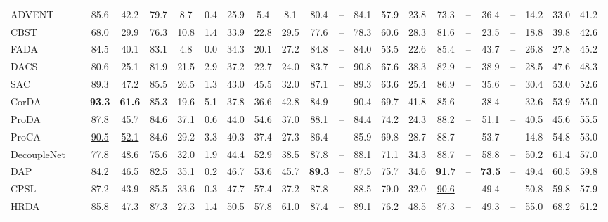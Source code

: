 \documentclass[10pt,twocolumn,letterpaper]{article}
\begin{document}
\begin{table*}
\begin{tabular}{l|c|ccccccccccccccccccc|c}
ADVENT~\cite{vu2019advent} & \parbox[t]{2mm}{} & 85.6 & 42.2 & 79.7 & 8.7 & 0.4 & 25.9 & 5.4 & 8.1 & 80.4 & -- & 84.1 & 57.9 & 23.8 & 73.3 & -- & 36.4 & -- & 14.2 & 33.0 & 41.2\\
CBST~\cite{zou2018unsupervised} &  & 68.0 & 29.9 & 76.3 & 10.8 & 1.4 & 33.9 & 22.8 & 29.5 & 77.6 & -- & 78.3 & 60.6 & 28.3 & 81.6 & -- & 23.5 & -- & 18.8 & 39.8 & 42.6\\
FADA~\cite{wang2020classes} &  & 84.5 & 40.1 & 83.1 & 4.8 & 0.0 & 34.3 & 20.1 & 27.2 & 84.8 & -- & 84.0 & 53.5 & 22.6 & 85.4 & -- & 43.7 & -- & 26.8 & 27.8 & 45.2\\
DACS~\cite{tranheden2021dacs} &  & 80.6 & 25.1 & 81.9 & 21.5 & 2.9 & 37.2 & 22.7 & 24.0 & 83.7 & -- & 90.8 & 67.6 & 38.3 & 82.9 & -- & 38.9 & -- & 28.5 & 47.6 & 48.3\\
SAC~\cite{araslanov2021self} &  & 89.3 & 47.2 & 85.5 & 26.5 & 1.3 & 43.0 & 45.5 & 32.0 & 87.1 & -- & 89.3 & 63.6 & 25.4 & 86.9 & -- & 35.6 & -- & 30.4 & 53.0 & 52.6\\
CorDA~\cite{wang2021domain} &  & \textbf{93.3} & \textbf{61.6} & 85.3 & 19.6 & 5.1 & 37.8 & 36.6 & 42.8 & 84.9 & -- & 90.4 & 69.7 & 41.8 & 85.6 & -- & 38.4 & -- & 32.6 & 53.9 & 55.0\\
ProDA~\cite{zhang2021prototypical} &  & 87.8 & 45.7 & 84.6 & 37.1 & 0.6 & 44.0 & 54.6 & 37.0 & \underline{88.1} & -- & 84.4 & 74.2 & 24.3 & 88.2 & -- & 51.1 & -- & 40.5 & 45.6 & 55.5\\
ProCA~\cite{jiang2022prototypical} &  & \underline{90.5} & \underline{52.1} & 84.6 & 29.2 & 3.3 & 40.3 & 37.4 & 27.3 & 86.4 & -- & 85.9 & 69.8 & 28.7 & 88.7 & -- & 53.7 & -- & 14.8 & 54.8 & 53.0\\
DecoupleNet~\cite{lai2022decouplenet} &  & 77.8 & 48.6 & 75.6 & 32.0 & 1.9 & 44.4 & 52.9 & 38.5 & 87.8 & -- & 88.1 & 71.1 & 34.3 & 88.7 & -- & 58.8 & -- & 50.2 & 61.4 & 57.0\\
DAP~\cite{huo2022domain} &  & 84.2 & 46.5 & 82.5 & 35.1 & 0.2 & 46.7 & 53.6 & 45.7 & \textbf{89.3} & -- & 87.5 & 75.7 & 34.6 & \textbf{91.7} & -- & \textbf{73.5} & -- & 49.4 & 60.5 & 59.8\\
CPSL~\cite{li2022class} &  & 87.2 & 43.9 & 85.5 & 33.6 & 0.3 & 47.7 & 57.4 & 37.2 & 87.8 & -- & 88.5 & 79.0 & 32.0 & \underline{90.6} & -- & 49.4 & -- & 50.8 & 59.8 & 57.9\\
HRDA~\cite{hoyer2022hrda} &  & 85.8 & 47.3 & 87.3 & 27.3 & 1.4 & 50.5 & 57.8 & \underline{61.0} & 87.4 & -- & 89.1 & 76.2 & 48.5 & 87.3 & -- & 49.3 & -- & 55.0 & \underline{68.2} & 61.2\\

\end{tabular}
\end{table*}
\end{document}
